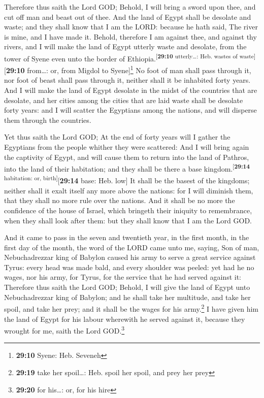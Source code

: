  Therefore thus saith the Lord GOD; Behold, I will bring a
sword upon thee, and cut off man and beast out of thee. 
And the land of Egypt shall be desolate and waste; and they shall know
that I am the LORD: because he hath said, The river is mine, and I have
made it.  Behold, therefore I am against thee, and
against thy rivers, and I will make the land of Egypt utterly waste and
desolate, from the tower of Syene even unto the border of
Ethiopia.\textsuperscript{{[}\textbf{29:10} utterly\ldots: Heb. wastes
of waste{]}}{[}\textbf{29:10} from\ldots: or, from Migdol to
Syene{]}\footnote{\textbf{29:10} Syene: Heb. Seveneh}  No
foot of man shall pass through it, nor foot of beast shall pass through
it, neither shall it be inhabited forty years.  And I
will make the land of Egypt desolate in the midst of the countries that
are desolate, and her cities among the cities that are laid waste shall
be desolate forty years: and I will scatter the Egyptians among the
nations, and will disperse them through the countries.

 Yet thus saith the Lord GOD; At the end of forty years
will I gather the Egyptians from the people whither they were scattered:
 And I will bring again the captivity of Egypt, and will
cause them to return into the land of Pathros, into the land of their
habitation; and they shall be there a base
kingdom.\textsuperscript{{[}\textbf{29:14} habitation: or,
birth{]}}{[}\textbf{29:14} base: Heb. low{]}  It shall be
the basest of the kingdoms; neither shall it exalt itself any more above
the nations: for I will diminish them, that they shall no more rule over
the nations.  And it shall be no more the confidence of
the house of Israel, which bringeth their iniquity to remembrance, when
they shall look after them: but they shall know that I am the Lord GOD.

 And it came to pass in the seven and twentieth year, in
the first month, in the first day of the month, the word of the LORD
came unto me, saying,  Son of man, Nebuchadrezzar king of
Babylon caused his army to serve a great service against Tyrus: every
head was made bald, and every shoulder was peeled: yet had he no wages,
nor his army, for Tyrus, for the service that he had served against it:
 Therefore thus saith the Lord GOD; Behold, I will give
the land of Egypt unto Nebuchadrezzar king of Babylon; and he shall take
her multitude, and take her spoil, and take her prey; and it shall be
the wages for his army.\footnote{\textbf{29:19} take her spoil\ldots:
  Heb. spoil her spoil, and prey her prey}  I have given
him the land of Egypt for his labour wherewith he served against it,
because they wrought for me, saith the Lord GOD.\footnote{\textbf{29:20}
  for his\ldots: or, for his hire}

